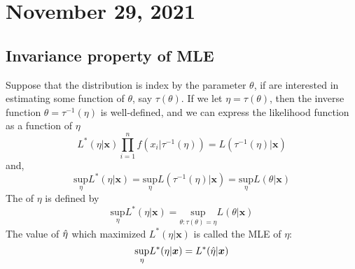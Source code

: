 \section{November 29, 2021}
\subsection{Invariance property of MLE}
Suppose that the distribution is index by the parameter $\theta$, if are interested in estimating some function of $\theta$, say $\tau(\theta)$.
If we let $\eta = \tau(\theta)$, then the inverse function $\theta = \tau^{-1}(\eta)$ is well-defined, and we can express the likelihood function as a function of $\eta$
$$
L^{*}(\eta|\boldsymbol{x}) \prod_{i=1}^{n}f(x_i|\tau^{-1}(\eta)) = L(\tau^{-1}(\eta)|\boldsymbol{x})
$$
and,
$$
\underset{\eta}{\text{sup}}L^{*}(\eta|\boldsymbol{x}) = \underset{\eta}{\text{sup}}L(\tau^{-1}(\eta)|\boldsymbol{x})
= \underset{\eta}{\text{sup}}L(\theta|\boldsymbol{x})
$$ 
The  of $\eta$ is defined by 
$$
\underset{\eta}{\text{sup}}L^{*}(\eta|\boldsymbol{x}) =
\underset{\theta: \tau(\theta) = \eta}{\text{sup}}L(\theta|\boldsymbol{x})
$$
The value of $\Hat{\eta}$ which maximized $L^{*}(\eta|\boldsymbol{x})$ is called the MLE of $\eta$:
$$
\underset{\eta}{\text{sup}}L^{*}(\eta|\boldsymbol{x}) =L^{*}(\Hat{\eta}|\boldsymbol{x})
$$